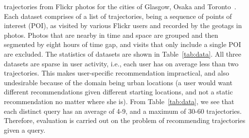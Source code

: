 trajectories from Flickr photos
for the cities of Glasgow, Osaka and Toronto~\cite{thomee2016yfcc100m,ijcai15}.
Each dataset comprises of a
list of trajectories, being a sequence of points of interest (POI), as visited by various Flickr users
and recorded by the geotags in photos. Photos that are nearby in time and space are grouped and then segmented by eight hours of time gap, and visits that only include a single POI are excluded.
The statistics of datasets are shown in Table~\ref{tab:data}.
All three datasets are sparse in user activity,
i.e., each user has on average less than two trajectories.
This makes user-specific recommendation impractical, and also undesirable because of the domain being urban locations
(a user would want different recommendations given different starting locations, and not a static recommendation no matter where she is).
From Table~\ref{tab:data}, %
we see that each distinct query %
has an average of 4-9, and a maximum of 30-60 trajectories.
Therefore, evaluation is carried out on the problem of recommending trajectories given a query.


